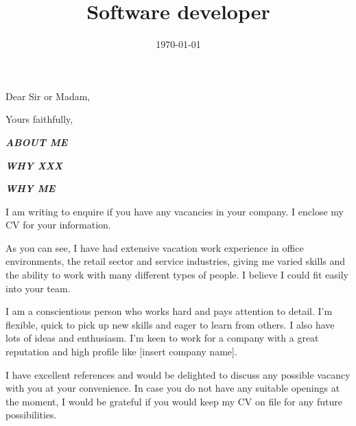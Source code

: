 \documentclass[11pt,a4paper]{moderncv}
\title{Software developer}
\begin{document}
\date{\today}
\opening{Dear Sir or Madam,}
\closing{Yours faithfully,}
\makelettertitle
\textbf{\textit{ABOUT ME}}

\textbf{\textit{WHY XXX}}

\textbf{\textit{WHY ME}}

I am writing to enquire if you have any vacancies in your company. I enclose my CV for your information.

As you can see, I have had extensive vacation work experience in office environments, the retail sector and service industries, giving me varied skills and the ability to work with many different types of people. I believe I could fit easily into your team.

I am a conscientious person who works hard and pays attention to detail. I'm flexible, quick to pick up new skills and eager to learn from others. I also have lots of ideas and enthusiasm. I'm keen to work for a company with a great reputation and high profile like [insert company name].

I have excellent references and would be delighted to discuss any possible vacancy with you at your convenience. In case you do not have any suitable openings at the moment, I would be grateful if you would keep my CV on file for any future possibilities.
\makeletterclosing
\end{document}
